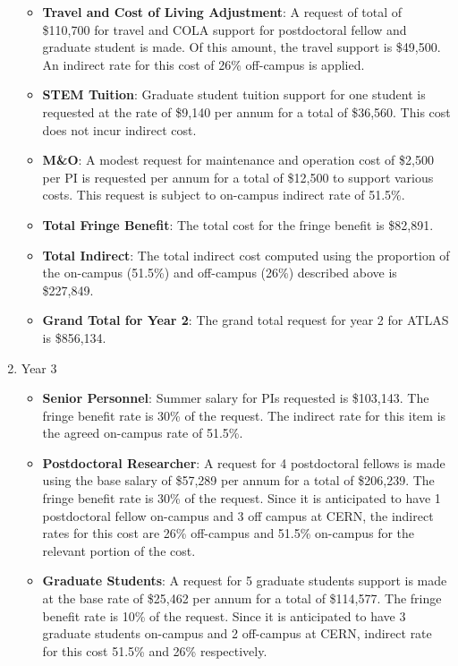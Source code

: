 \begin{enumerate}
\begin{itemize}
\item{{\bf Travel and Cost of Living Adjustment}:  A request of total of \$110,700 for travel and COLA support for postdoctoral fellow and graduate student is made. Of this amount, the travel support is \$49,500.  An indirect rate for this cost of 26\% off-campus is applied. }

\item {{\bf STEM Tuition}: Graduate student tuition support for one student is requested at the rate of \$9,140 per annum for a total of \$36,560.  This cost does not incur indirect cost.}

\item {{\bf M\&O}: A modest request for maintenance and operation cost of \$2,500 per PI is requested per annum for a total of \$12,500 to support various costs. This request is subject to on-campus indirect rate of 51.5\%.}

\item {{\bf Total Fringe Benefit}: The total cost for the fringe benefit is \$82,891.}

\item {{\bf Total Indirect}: The total indirect cost computed using the proportion of the on-campus (51.5\%) and off-campus (26\%) described above is \$227,849.}

\item {{\bf Grand Total for Year 2}: The grand total request for year 2 for ATLAS is \$856,134.}

\end{itemize}

\item{Year 3}
\begin{itemize}
\item{{\bf Senior Personnel}: Summer salary for PIs requested is \$103,143.   The fringe benefit rate is 30\% of the request.  The indirect rate for this item is the agreed on-campus rate of 51.5\%.}

\item {{\bf Postdoctoral Researcher}: A request for 4 postdoctoral fellows is made using the base salary of \$57,289 per annum for a total of \$206,239.  The fringe benefit rate is 30\% of the request.  Since it is anticipated to have 1 postdoctoral fellow on-campus and 3 off campus at CERN, the indirect rates for this cost are 26\% off-campus and 51.5\% on-campus for the relevant portion of the cost.} 

\item{{\bf Graduate Students}: A request for 5 graduate students support is made at the base rate of \$25,462 per annum for a total of \$114,577.  The fringe benefit rate is 10\% of the request.  Since it is anticipated to have 3 graduate students on-campus and 2 off-campus at CERN, indirect rate for this cost 51.5\% and 26\% respectively.}



\end{itemize}
\end{enumerate}
